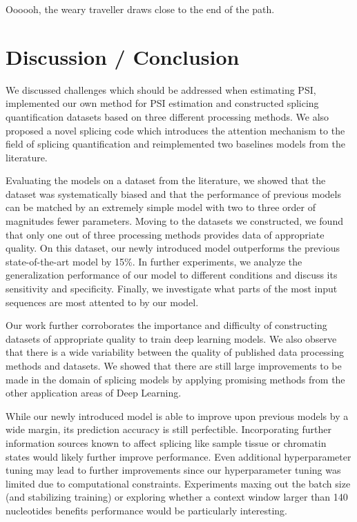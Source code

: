 \begin{savequote}[8cm]
	
	Oooooh, the weary traveller draws close to the end of the path.
\end{savequote}

\chapter{\label{ch:6-conclusion}Discussion / Conclusion}


We discussed challenges which should be addressed when estimating PSI, implemented our own method for PSI estimation and constructed splicing quantification datasets based on three different processing methods. We also proposed a novel splicing code which introduces the attention mechanism to the field of splicing quantification and reimplemented two baselines models from the literature.

Evaluating the models on a dataset from the literature, we showed that the dataset was systematically biased and that the performance of previous models can be matched by an extremely simple model with two to three order of magnitudes fewer parameters. 
Moving to the datasets we constructed, we found that only one out of three processing methods provides data of appropriate quality. On this dataset, our newly introduced model outperforms the previous state-of-the-art model by 15\%. In further experiments, we analyze the generalization performance of our model to different conditions and discuss its sensitivity and specificity. Finally, we investigate what parts of the most input sequences are most attented to by our model.

Our work further corroborates the importance and difficulty of constructing datasets of appropriate quality to train deep learning models. We also observe that there is a wide variability between the quality of published data processing methods and datasets. We showed that there are still large improvements to be made in the domain of splicing models by applying promising methods from the other application areas of Deep Learning. %

While our newly introduced model is able to improve upon previous models by a wide margin, its prediction accuracy is still perfectible. Incorporating further information sources known to affect splicing like sample tissue or chromatin states \cite{chromatin} would likely further improve performance. 
Even additional hyperparameter tuning may lead to further improvements since our hyperparameter tuning was limited due to computational constraints. Experiments maxing out the batch size (and stabilizing training) or exploring whether a context window larger than 140 nucleotides benefits performance would be particularly interesting. 

